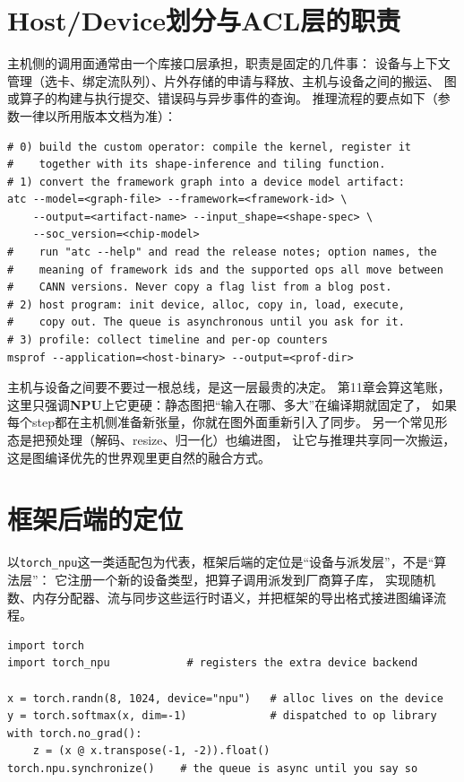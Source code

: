 \documentclass[12pt,a4paper,fontset=fandol]{ctexbook}
\newcommand{\Tp}[1]{\texttt{#1}}
\newcommand{\Dom}[1]{\textsf{\bfseries #1}}
\newcommand{\NPU}{\Dom{NPU}}
\begin{document}
\section{Host/Device划分与ACL层的职责}

主机侧的调用面通常由一个库接口层承担，职责是固定的几件事：
设备与上下文管理（选卡、绑定流队列）、片外存储的申请与释放、主机与设备之间的搬运、
图或算子的构建与执行提交、错误码与异步事件的查询。
推理流程的要点如下（参数一律以所用版本文档为准）：

\begin{lstlisting}[style=shellstyle,caption={离线转换与推理流程的命令要点}]
# 0) build the custom operator: compile the kernel, register it
#    together with its shape-inference and tiling function.
# 1) convert the framework graph into a device model artifact:
atc --model=<graph-file> --framework=<framework-id> \
    --output=<artifact-name> --input_shape=<shape-spec> \
    --soc_version=<chip-model>
#    run "atc --help" and read the release notes; option names, the
#    meaning of framework ids and the supported ops all move between
#    CANN versions. Never copy a flag list from a blog post.
# 2) host program: init device, alloc, copy in, load, execute,
#    copy out. The queue is asynchronous until you ask for it.
# 3) profile: collect timeline and per-op counters
msprof --application=<host-binary> --output=<prof-dir>
\end{lstlisting}

主机与设备之间要不要过一根总线，是这一层最贵的决定。
第11章会算这笔账，这里只强调\NPU{}上它更硬：静态图把``输入在哪、多大''在编译期就固定了，
如果每个step都在主机侧准备新张量，你就在图外面重新引入了同步。
另一个常见形态是把预处理（解码、resize、归一化）也编进图，
让它与推理共享同一次搬运，这是图编译优先的世界观里更自然的融合方式。

\section{框架后端的定位}

以\Tp{torch\_npu}这一类适配包为代表，框架后端的定位是``设备与派发层''，不是``算法层''：
它注册一个新的设备类型，把算子调用派发到厂商算子库，
实现随机数、内存分配器、流与同步这些运行时语义，并把框架的导出格式接进图编译流程。

\begin{lstlisting}[style=pythonstyle,caption={后端切换的示意：设备字符串与同步语义由适配包提供}]
import torch
import torch_npu            # registers the extra device backend

x = torch.randn(8, 1024, device="npu")   # alloc lives on the device
y = torch.softmax(x, dim=-1)             # dispatched to op library
with torch.no_grad():
    z = (x @ x.transpose(-1, -2)).float()
torch.npu.synchronize()    # the queue is async until you say so
\end{lstlisting}
\end{document}
